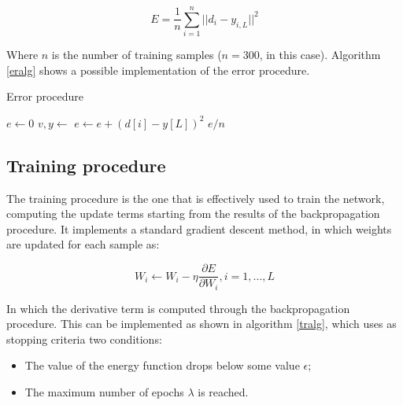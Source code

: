 \documentclass[letterpaper,headings=standardclasses]{scrartcl}
\begin{document}
$$ E = \frac{1}{n} \sum_{i = 1}^{n} || d_i - y_{i,L} ||^2 $$

Where $n$ is the number of training samples ($n = 300$, in this case). Algorithm \ref{eralg} shows a possible implementation of the error procedure.

\begin{algorithm}[h]
    \caption{Error procedure}
    \label{eralg}
    \begin{algorithmic}
    
        \State $e \gets 0$
            \State $v, y \gets $ 
            \State $e \gets e + (d[i] - y[L])^2$
        \EndFor
        \State \Return $e / n$
    \EndFunction
    
    \end{algorithmic}
\end{algorithm}

\subsection{Training procedure}

The training procedure is the one that is effectively used to train the network, computing the update terms starting from the results of the backpropagation procedure. It implements a standard gradient descent method, in which weights are updated for each sample as:

$$ W_i \leftarrow W_i - \eta \frac{\partial E}{\partial W_i}, i = 1, \dots, L $$

In which the derivative term is computed through the backpropagation procedure. This can be implemented as shown in algorithm \ref{tralg}, which uses as stopping criteria two conditions:

\begin{itemize}
    \item The value of the energy function drops below some value $\epsilon$;
    \item The maximum number of epochs $\lambda$ is reached.
\end{itemize}
\end{document}
